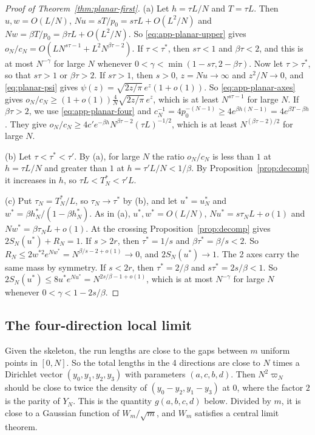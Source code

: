 \begin{proof}[Proof of Theorem~\ref{thm:planar-first}]
(a) Let $h=\tau L/N$ and $T=\tau L$. Then $u,w=O(L/N)$, $Nu=sT/p_0=s\tau L+O(L^2/N)$ and
$Nw=\beta T/p_0=\beta\tau L+O(L^2/N)$. So \eqref{eq:app-planar-upper} gives
$o_N/c_N=O(LN^{s\tau-1}+L^2N^{\beta\tau-2})$. If $\tau<\tau^*$, then $s\tau<1$ and $\beta\tau<2$,
and this is at most $N^{-\gamma}$ for large $N$ whenever $0<\gamma<\min(1-s\tau,2-\beta\tau)$. Now
let $\tau>\tau^*$, so that $s\tau>1$ or $\beta\tau>2$. If $s\tau>1$, then $s>0$, $z=Nu\to\infty$ and
$z^2/N\to0$, and \eqref{eq:planar-psi} gives $\psi(z)=\sqrt{2z/\pi}\,e^z(1+o(1))$. So
\eqref{eq:app-planar-axes} gives $o_N/c_N\ge(1+o(1))\frac4N\sqrt{2z/\pi}\,e^z$, which is at least
$N^{s\tau-1}$ for large $N$. If $\beta\tau>2$, we use \eqref{eq:app-planar-four} and
$c_N^{-1}=4p_0^{-(N-1)}\ge4e^{\beta h(N-1)}=4e^{\beta T-\beta h}$. They give
$o_N/c_N\ge4c'e^{-\beta h}N^{\beta\tau-2}(\tau L)^{-1/2}$, which is at least $N^{(\beta\tau-2)/2}$
for large $N$.

(b) Let $\tau<\tau^*<\tau'$. By (a), for large $N$ the ratio $o_N/c_N$ is less than $1$ at
$h=\tau L/N$ and greater than $1$ at $h=\tau'L/N<1/\beta$. By Proposition~\ref{prop:decomp} it
increases in $h$, so $\tau L<T^*_N<\tau'L$.

(c) Put $\tau_N=T^*_N/L$, so $\tau_N\to\tau^*$ by (b), and let $u^*=u^*_N$ and
$w^*=\beta h^*_N/(1-\beta h^*_N)$. As in (a), $u^*,w^*=O(L/N)$, $Nu^*=s\tau_NL+o(1)$ and
$Nw^*=\beta\tau_NL+o(1)$. At the crossing Proposition~\ref{prop:decomp} gives $2S_N(u^*)+R_N=1$.
If $s>2r$, then $\tau^*=1/s$ and $\beta\tau^*=\beta/s<2$. So
$R_N\le2w^{*2}e^{Nw^*}=N^{\beta/s-2+o(1)}\to0$, and $2S_N(u^*)\to1$. The 2 axes carry the same mass
by symmetry. If $s<2r$, then $\tau^*=2/\beta$ and $s\tau^*=2s/\beta<1$. So
$2S_N(u^*)\le8u^*e^{Nu^*}=N^{2s/\beta-1+o(1)}$, which is at most $N^{-\gamma}$ for large $N$
whenever $0<\gamma<1-2s/\beta$.
\end{proof}

\subsection{The four-direction local limit}

Given the skeleton, the run lengths are close to the gaps between $m$ uniform points in $[0,N]$.
So the total lengths in the 4 directions are close to $N$ times a Dirichlet vector
$(y_0,y_1,y_2,y_3)$ with parameters $(a,c,b,d)$. Then $N^2\varpi_N$ should be close to twice the
density of $(y_0-y_2,y_1-y_3)$ at $0$, where the factor $2$ is the parity of $Y_N$. This is the
quantity $g(a,b,c,d)$ below. Divided by $m$, it is close to a Gaussian function of $W_m/\sqrt m$,
and $W_m$ satisfies a central limit theorem.

